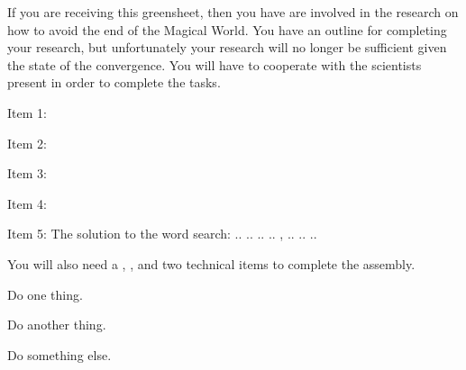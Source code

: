 \documentclass[green]{guildcamp3}
\begin{document}
\name{\gSaveTheWorldMages{}}






If you are receiving this greensheet, then you have are involved in the research on how to avoid the end of the Magical World. You have an outline for completing your research, but unfortunately your research will no longer be sufficient given the state of the convergence. You will have to cooperate with the scientists present in order to complete the tasks. 

Item 1:

Item 2:

Item 3:

Item 4:

Item 5: The solution to the word search: .. .. .. ..  ,  .. .. ..



You will also need a \iCauldron{}, \iPlumbicRod{}, and two technical items to complete the assembly. 


\begin{enum}[Directions]
  \item Do one thing.
  \item Do another thing.
  \item Do something else.
\end{enum}
\end{document}
